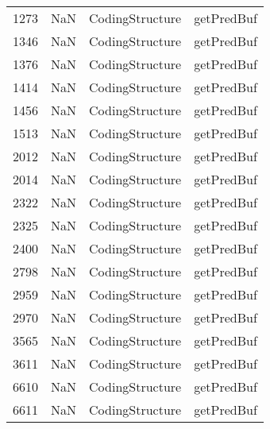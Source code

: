 \begin{tabular}{llll}
1273 &                   NaN &            CodingStructure &                                getPredBuf \\
1346 &                   NaN &            CodingStructure &                                getPredBuf \\
1376 &                   NaN &            CodingStructure &                                getPredBuf \\
1414 &                   NaN &            CodingStructure &                                getPredBuf \\
1456 &                   NaN &            CodingStructure &                                getPredBuf \\
1513 &                   NaN &            CodingStructure &                                getPredBuf \\
2012 &                   NaN &            CodingStructure &                                getPredBuf \\
2014 &                   NaN &            CodingStructure &                                getPredBuf \\
2322 &                   NaN &            CodingStructure &                                getPredBuf \\
2325 &                   NaN &            CodingStructure &                                getPredBuf \\
2400 &                   NaN &            CodingStructure &                                getPredBuf \\
2798 &                   NaN &            CodingStructure &                                getPredBuf \\
2959 &                   NaN &            CodingStructure &                                getPredBuf \\
2970 &                   NaN &            CodingStructure &                                getPredBuf \\
3565 &                   NaN &            CodingStructure &                                getPredBuf \\
3611 &                   NaN &            CodingStructure &                                getPredBuf \\
6610 &                   NaN &            CodingStructure &                                getPredBuf \\
6611 &                   NaN &            CodingStructure &                                getPredBuf \\

\end{tabular}
